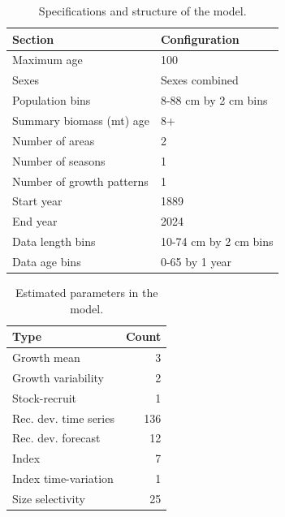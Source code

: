 \documentclass[
]{scrartcl}
\begin{document}
\begin{longtable}{ll}

\caption{\label{tbl-model-config}Specifications and structure of the
model.}

\tabularnewline

\toprule
Section & Configuration \\ 
\midrule\addlinespace[2.5pt]
Maximum age & 100 \\ 
Sexes & Sexes combined \\ 
Population bins & 8-88 cm by 2 cm bins \\ 
Summary biomass (mt) age & 8+ \\ 
Number of areas & 2 \\ 
Number of seasons & 1 \\ 
Number of growth patterns & 1 \\ 
Start year & 1889 \\ 
End year & 2024 \\ 
Data length bins & 10-74 cm by 2 cm bins \\ 
Data age bins & 0-65 by 1 year \\ 
\bottomrule

\end{longtable}

\endgroup

\begingroup
\fontsize{9.0pt}{10.8pt}\selectfont

\begin{longtable}{lr}

\caption{\label{tbl-n-param}Estimated parameters in the model.}

\tabularnewline

\toprule
Type & Count \\ 
\midrule\addlinespace[2.5pt]
Growth mean & 3 \\ 
Growth variability & 2 \\ 
Stock-recruit & 1 \\ 
Rec. dev. time series & 136 \\ 
Rec. dev. forecast & 12 \\ 
Index & 7 \\ 
Index time-variation & 1 \\ 
Size selectivity & 25 \\ 
\bottomrule

\end{longtable}

\endgroup
\end{document}
